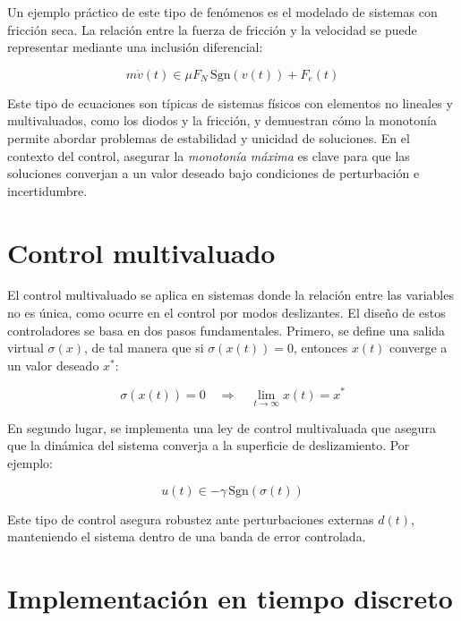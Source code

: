 \documentclass[conference]{IEEEtran}
\begin{document}
Un ejemplo práctico de este tipo de fenómenos es el modelado de sistemas con fricción seca. La relación entre la fuerza de fricción y la velocidad se puede representar mediante una inclusión diferencial:

\begin{equation}
	m \dot{v}(t) \in \mu F_N \, \text{Sgn}(v(t)) + F_e(t)
\end{equation}

Este tipo de ecuaciones son típicas de sistemas físicos con elementos no lineales y multivaluados, como los diodos y la fricción, y demuestran cómo la monotonía permite abordar problemas de estabilidad y unicidad de soluciones. En el contexto del control, asegurar la \textit{monotonía máxima} es clave para que las soluciones converjan a un valor deseado bajo condiciones de perturbación e incertidumbre.


\section{Control multivaluado}

El control multivaluado se aplica en sistemas donde la relación entre las variables no es única, como ocurre en el control por modos deslizantes. El diseño de estos controladores se basa en dos pasos fundamentales. Primero, se define una salida virtual \( \sigma(x) \), de tal manera que si \( \sigma(x(t)) = 0 \), entonces \( x(t) \) converge a un valor deseado \( x^* \):

\begin{equation}
	\sigma(x(t)) = 0 \quad \Rightarrow \quad \lim_{t \to \infty} x(t) = x^*
\end{equation}

En segundo lugar, se implementa una ley de control multivaluada que asegura que la dinámica del sistema converja a la superficie de deslizamiento. Por ejemplo:

\begin{equation}
	u(t) \in -\gamma \, \text{Sgn}(\sigma(t))
\end{equation}

Este tipo de control asegura robustez ante perturbaciones externas \( d(t) \), manteniendo el sistema dentro de una banda de error controlada.

\section{Implementación en tiempo discreto}
\end{document}
